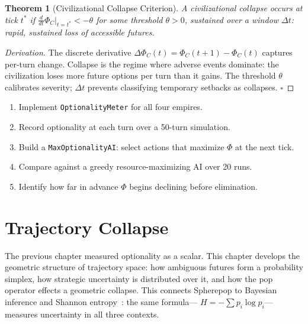 \documentclass[11pt,a4paper,openany]{book}
\theoremstyle{plain}
\newtheorem{theorem}{Theorem}[chapter]
\theoremstyle{definition}
\theoremstyle{remark}
\newenvironment{background}{%
  \begin{mdframed}[
    linecolor=sphereblue!40, backgroundcolor=sphereblue!5,
    linewidth=1pt, innertopmargin=8pt, innerbottommargin=8pt,
    innerleftmargin=10pt, innerrightmargin=10pt,
    skipabove=10pt, skipbelow=6pt
  ]%
  \setlength{\parindent}{0pt}%
  \noindent{\textcolor{sphereblue}{\textbf{Background}}}\par\smallskip\ignorespaces
}{\end{mdframed}}
\newenvironment{project}[1]{%
  \begin{tcolorbox}[
    title={\textbf{Project: #1}},
    colback=projectbg,
    colframe=sphereblue,
    fonttitle=\bfseries\color{white},
    coltitle=white,
    attach boxed title to top left={yshift=-2mm, xshift=4mm},
    boxed title style={colback=sphereblue, sharp corners},
    sharp corners,
    breakable,
    before upper={\normalfont\setlength{\parindent}{0pt}\tolerance=9999\hbadness=9999}
  ]
}{\end{tcolorbox}}
\begin{document}
\begin{theorem}[Civilizational Collapse Criterion]
  A civilizational collapse occurs at tick $t^*$ if
  $\frac{d}{dt}\Phi_C\big|_{t=t^*} < -\theta$ for some threshold
  $\theta > 0$, sustained over a window $\Delta t$: rapid, sustained
  loss of accessible futures.
\end{theorem}
\begin{proof}[Derivation]
  The discrete derivative $\Delta\Phi_C(t) = \Phi_C(t+1) - \Phi_C(t)$
  captures per-turn change. Collapse is the regime where adverse
  events dominate: the civilization loses more future options per turn
  than it gains. The threshold $\theta$ calibrates severity; $\Delta t$
  prevents classifying temporary setbacks as collapses. $\square$
\end{proof}

\begin{project}{Optionality Metrics for AI Decision-Making}
  \begin{enumerate}
    \item Implement \texttt{OptionalityMeter} for all four empires.
    \item Record optionality at each turn over a 50-turn simulation.
    \item Build a \texttt{MaxOptionalityAI}: select actions that
          maximize $\Phi$ at the next tick.
    \item Compare against a greedy resource-maximizing AI over 20 runs.
    \item Identify how far in advance $\Phi$ begins declining before
          elimination.
  \end{enumerate}
\end{project}

\chapter{Trajectory Collapse}
\label{ch:trajcollapse}

\begin{background}
  The previous chapter measured optionality as a scalar. This chapter
  develops the geometric structure of trajectory space: how ambiguous
  futures form a probability simplex, how strategic uncertainty is
  distributed over it, and how the pop operator effects a geometric
  collapse. This connects Spherepop to Bayesian inference and Shannon
  entropy~\cite{Shannon}: the same formula---
  $H = -\sum p_i \log p_i$---measures uncertainty in all three contexts.
\end{background}
\end{document}

